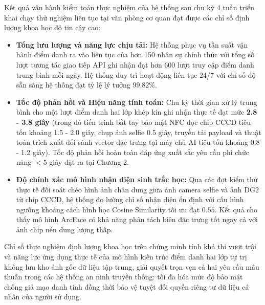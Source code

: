 \documentclass[../DoAn.tex]{subfiles}
\begin{document}
Kết quả vận hành kiểm toán thực nghiệm của hệ thống sau chu kỳ 4 tuần triển khai chạy thử nghiệm liên tục tại văn phòng cơ quan đạt được các chỉ số định lượng khoa học độ tin cậy cao:
\begin{itemize}
    \item \textbf{Tổng lưu lượng và năng lực chịu tải:} Hệ thống phục vụ tần suất vận hành điểm danh ra vào liên tục của hơn 150 nhân sự chính thức với tổng số lượt tương tác giao tiếp API ghi nhận đạt hơn 600 lượt truy cập điểm danh trung bình mỗi ngày. Hệ thống duy trì hoạt động liên tục 24/7 với chỉ số độ sẵn sàng hệ thống đạt tỷ lệ lý tưởng $99.82\%$.
    \item \textbf{Tốc độ phản hồi và Hiệu năng tính toán:} Chu kỳ thời gian xử lý trung bình cho một lượt điểm danh hai lớp khép kín ghi nhận thực tế đạt mức \textbf{2.8 - 3.8 giây} (trong đó tiến trình bắt tay bảo mật NFC đọc chip CCCD tiêu tốn khoảng 1.5 - 2.0 giây, chụp ảnh selfie 0.5 giây, truyền tải payload và thuật toán trích xuất đối sánh vector đặc trưng tại máy chủ AI tiêu tốn khoảng 0.8 - 1.2 giây). Tốc độ phản hồi hoàn toàn đáp ứng xuất sắc yêu cầu phi chức năng $<5$ giây đặt ra tại Chương 2.
    \item \textbf{Độ chính xác mô hình nhận diện sinh trắc học:} Qua các đợt kiểm thử thực tế đối soát chéo hình ảnh chân dung giữa ảnh camera selfie và ảnh DG2 từ chip CCCD, hệ thống đo lường chỉ số nhận diện ổn định với cấu hình ngưỡng khoảng cách hình học Cosine Similarity tối ưu đạt $0.55$. Kết quả cho thấy mô hình ArcFace có khả năng phân tách biên đặc trưng tốt ngay cả với ảnh chip nén dung lượng thấp.
\end{itemize}

Chỉ số thực nghiệm định lượng khoa học trên chứng minh tính khả thi vượt trội và năng lực ứng dụng thực tế của mô hình kiến trúc điểm danh hai lớp tự trị không lưu kho ảnh gốc dữ liệu tập trung, giải quyết trọn vẹn cả hai yêu cầu mâu thuẫn trong các hệ thống an ninh truyền thống: tối đa hóa mức độ bảo mật chống giả mạo danh tính đồng thời bảo vệ tuyệt đối quyền riêng tư dữ liệu cá nhân của người sử dụng.
\end{document}
